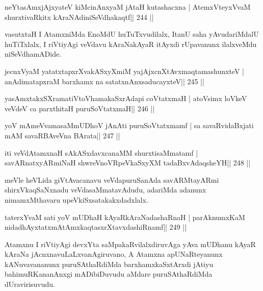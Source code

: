 \begin{shl}
neYtasAmxjAjxyateV kiMcinAnxyaM jAtaH kutashacxna |
AtemxVteyxVvaM shurxtivaRkitx kAraNAdiniSeVdhakaqtf\hfill || 244 ||
\end{shl}

\begin{artha}
vasutxtaH I AtamxniMda EnoMdU huTuTxvudilalx, ItanU saha yAvudariMdalU huTiTxlalx, I riVtiyAgi veVdavu kAraNakAyaR itAyxdi rUpavanunx ilalxveMdu niSeVdhamADide.
\end{artha}


\begin{shl}
jecnxVyaM yatatxtapxrXvakASxyXmiM yajAjxcnXtAvx\s maqtamashunxteV |
anAdimatapxraM barxhamx na satatxnAnxsaducayxteV\hfill || 245 ||
\end{shl}

\begin{shl}
yasAmxtakxSXramatiVtoV\s hamakaSxrAdapi coVtatxmaH |
atoV\s simx loVkeV veVdeV ca parxthitaH puruSoVtatxmaH\hfill || 246 ||
\end{shl}

\begin{shl}
yoV mAmeVvamasaMmUDhoV jAnAti puruSoVtatxmamf |
sa savaRvidaBxjati mAM savaRBAveVna BArata\hfill || 247 ||
\end{shl}

\begin{shl}
iti veVdAtamxnaH sAkASxdavxcanaMM shurxtisaMmatamf |
savARnatxyARmiNaH shwreVnoVRpeVkaSxyXM tadaBxvAdaqsheYH\hfill || 248 ||
\end{shl}

\begin{artha}
meVle heVLida giVtAvacanavu veVdapuruSanAda savARMtayARmi shirxVkaqSaNxnadu veVdasaMmatavAdudu, adariMda adanunx nimamxMthavaru upeVkiSxsatakakxdadxlalx.
\end{artha}


\begin{shl}
taterxYvaM sati yoV mUDhaH kAyaRkAraNadashaRnaH |
parAknumxKaM nidadhAyxtatxmAtAmxkaqtasxrXtavxdashiRnamf\hfill || 249 ||
\end{shl}

\begin{artha}
Atamxnu I riVtiyAgi devxYta saMpakaRvilalxdiruvAga yAva mUDhanu kAyaR kAraNa jAcnxnavuLaLxvanAgiruvano, A Atamxna apUNaRteyanunx kANuvavananunx puruSAthaRdiMda barxhamxkaSxtArxdi jAtiyu bahimuRKananAnxgi mADibiDuvudu aMdare puruSAthaRdiMda dUravirisuvudu.
\end{artha}

